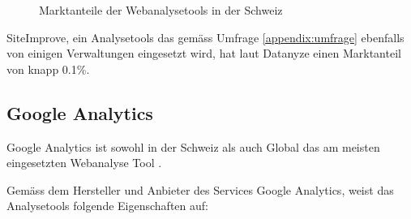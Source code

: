 \begin{figure}[h]
  \centering
  \caption{Marktanteile der Webanalysetools in der Schweiz \parencite{datanyzeSwitzerlandWebanalytics}}
  \label{fig:marktanteil}
\end{figure}

SiteImprove, ein Analysetools das gemäss Umfrage \ref{appendix:umfrage} ebenfalls von einigen Verwaltungen eingesetzt wird, hat laut Datanyze \parencite{datanyzeSwitzerlandWebanalytics} einen Marktanteil von knapp 0.1\%.

\subsection{Google Analytics}
Google Analytics ist sowohl in der Schweiz als auch Global das am meisten eingesetzten Webanalyse Tool \parencite{datanyzeSwitzerlandWebanalytics}. 

Gemäss dem Hersteller und Anbieter des Services Google Analytics, weist das Analysetools folgende Eigenschaften auf:

